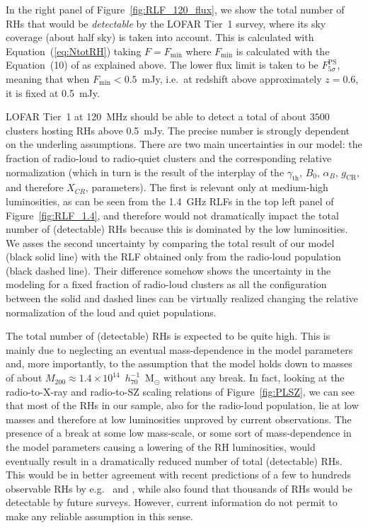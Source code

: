 \documentclass[traditabstract]{aa}
\newcommand{\rmn}{\mathrm}
\begin{document}
In the right panel of Figure~\ref{fig:RLF_120_flux}, we show the total number of RHs that would be \emph{detectable} by the LOFAR Tier~1 survey, where its sky coverage (about half sky) is taken into account. This is calculated with Equation~(\ref{eq:NtotRH}) taking $F = F_{\rmn{min}}$ where $F_{\rmn{min}}$ is calculated with the Equation~(10) of \cite{2010A&A...509A..68C} as explained above. The lower flux limit is taken to be $F_{5\sigma}^{\rmn{PS}}$, meaning that when $F_{\rmn{min}} < 0.5$~mJy, i.e.~at redshift above approximately $z = 0.6$, it is fixed at 0.5~mJy.  

LOFAR Tier~1 at 120~MHz should be able to detect a total of about $3500$ clusters hosting RHs above 0.5~mJy. The precise number is strongly dependent on the underling assumptions. There are two main uncertainties in our model: the fraction of radio-loud to radio-quiet clusters and the corresponding relative normalization (which in turn is the result of the interplay of the $\gamma_{\rmn{th}}$, $B_{0}$, $\alpha_{B}$, $g_{\rmn{CR}}$, and therefore $X_{CR}$, parameters). The first is relevant only at medium-high luminosities, as can be seen from the 1.4~GHz RLFs in the top left panel of Figure~\ref{fig:RLF_1.4}, and therefore would not dramatically impact the total number of (detectable) RHs because this is dominated by the low luminosities. We asses the second uncertainty by comparing the total result of our model (black solid line) with the RLF obtained only from the radio-loud population (black dashed line). Their difference somehow shows the uncertainty in the modeling for a fixed fraction of radio-loud clusters as all the configuration between the solid and dashed lines can be virtually realized changing the relative normalization of the loud and quiet populations. 

The total number of (detectable) RHs is expected to be quite high. This is mainly due to neglecting an eventual mass-dependence in the model parameters and, more importantly, to the assumption that the model holds down to masses of about $M_{200}\approx1.4\times10^{14}$~$h_{70}^{-1}$~M$_{\odot}$ without any break. In fact, looking at the radio-to-X-ray and radio-to-SZ scaling relations of Figure~\ref{fig:PLSZ}, we can see that most of the RHs in our sample, also for the radio-loud population, lie at low masses and therefore at low luminosities unproved by current observations. The presence of a break at some low mass-scale, or some sort of mass-dependence in the model parameters causing a lowering of the RH luminosities, would eventually result in a dramatically reduced number of total (detectable) RHs. This would be in better agreement with recent predictions of a few to hundreds observable RHs by e.g.~\cite{2010A&A...509A..68C} and \cite{2011arXiv1110.2786S}, while \cite{2002A&A...396...83E} also found that thousands of RHs would be detectable by future surveys. However, current information do not permit to make any reliable assumption in this sense. 
\end{document}
